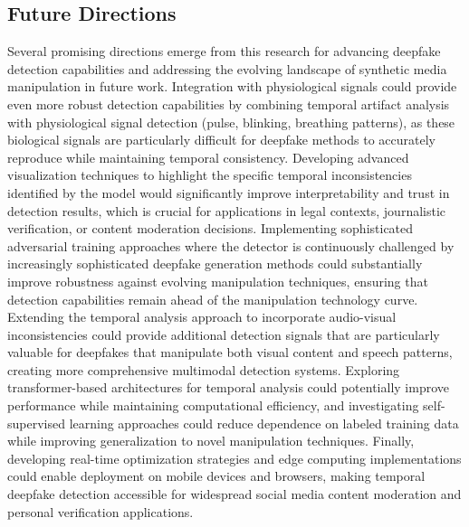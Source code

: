 \documentclass[conference]{IEEEtran}
\begin{document}
\subsection{Future Directions}
Several promising directions emerge from this research for advancing deepfake detection capabilities and addressing the evolving landscape of synthetic media manipulation in future work.
Integration with physiological signals could provide even more robust detection capabilities by combining temporal artifact analysis with physiological signal detection (pulse, blinking, breathing patterns), as these biological signals are particularly difficult for deepfake methods to accurately reproduce while maintaining temporal consistency.
Developing advanced visualization techniques to highlight the specific temporal inconsistencies identified by the model would significantly improve interpretability and trust in detection results, which is crucial for applications in legal contexts, journalistic verification, or content moderation decisions.
Implementing sophisticated adversarial training approaches where the detector is continuously challenged by increasingly sophisticated deepfake generation methods could substantially improve robustness against evolving manipulation techniques, ensuring that detection capabilities remain ahead of the manipulation technology curve.
Extending the temporal analysis approach to incorporate audio-visual inconsistencies could provide additional detection signals that are particularly valuable for deepfakes that manipulate both visual content and speech patterns, creating more comprehensive multimodal detection systems.
Exploring transformer-based architectures for temporal analysis could potentially improve performance while maintaining computational efficiency, and investigating self-supervised learning approaches could reduce dependence on labeled training data while improving generalization to novel manipulation techniques.
Finally, developing real-time optimization strategies and edge computing implementations could enable deployment on mobile devices and browsers, making temporal deepfake detection accessible for widespread social media content moderation and personal verification applications.

\end{document}
